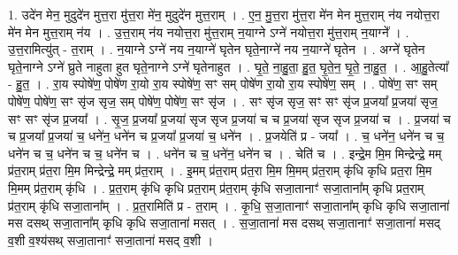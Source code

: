 \documentclass[17pt]{extarticle}
\begin{document}
1. उदे॑न मेन॒ मुदुदे॑न मुत्त॒रा मु॑त्त॒रा मे॑न॒ मुदुदे॑न मुत्त॒राम् । . ए॒न॒ मु॒त्त॒रा मु॑त्त॒रा मे॑न मेन मुत्त॒राम् न॑य नयोत्त॒रा मे॑न मेन मुत्त॒राम् न॑य । . उ॒त्त॒राम् न॑य नयोत्त॒रा मु॑त्त॒राम् न॒याग्ने ऽग्ने॑ नयोत्त॒रा मु॑त्त॒राम् न॒याग्ने᳚ । . उ॒त्त॒रामित्यु॑त् - त॒राम् । . न॒याग्ने ऽग्ने॑ नय न॒याग्ने॑ घृतेन घृते॒नाग्ने॑ नय न॒याग्ने॑ घृतेन । . अग्ने॑ घृतेन घृते॒नाग्ने ऽग्ने॑ घ्रुते नाहुता हुत घृते॒नाग्ने ऽग्ने॑ घृतेनाहुत । . घृ॒ते॒ ना॒हु॒ता॒ हु॒त॒ घृ॒ते॒न॒ घृ॒ते॒ ना॒हु॒त॒ । . आ॒हु॒तेत्या᳚ - हु॒त॒ । . रा॒य स्पोषे॑ण॒ पोषे॑ण रा॒यो रा॒य स्पोषे॑ण॒ सꣳ सम् पोषे॑ण रा॒यो रा॒य स्पोषे॑ण॒ सम् । . पोषे॑ण॒ सꣳ सम् पोषे॑ण॒ पोषे॑ण॒ सꣳ सृ॑ज सृज॒ सम् पोषे॑ण॒ पोषे॑ण॒ सꣳ सृ॑ज । . सꣳ सृ॑ज सृज॒ सꣳ सꣳ सृ॑ज प्र॒जया᳚ प्र॒जया॑ सृज॒ सꣳ सꣳ सृ॑ज प्र॒जया᳚ । . सृ॒ज॒ प्र॒जया᳚ प्र॒जया॑ सृज सृज प्र॒जया॑ च च प्र॒जया॑ सृज सृज प्र॒जया॑ च । . प्र॒जया॑ च च प्र॒जया᳚ प्र॒जया॑ च॒ धने॑न॒ धने॑न च प्र॒जया᳚ प्र॒जया॑ च॒ धने॑न । . प्र॒जयेति॑ प्र - जया᳚ । . च॒ धने॑न॒ धने॑न च च॒ धने॑न च च॒ धने॑न च च॒ धने॑न च । . धने॑न च च॒ धने॑न॒ धने॑न च । . चेति॑ च । . इन्द्रे॒म मि॒म मिन्द्रेन्द्रे॒ मम् प्र॑त॒राम् प्र॑त॒रा मि॒म मिन्द्रेन्द्रे॒ मम् प्र॑त॒राम् । . इ॒मम् प्र॑त॒राम् प्र॑त॒रा मि॒म मि॒मम् प्र॑त॒राम् कृ॑धि कृधि प्रत॒रा मि॒म मि॒मम् प्र॑त॒राम् कृ॑धि । . प्र॒त॒राम् कृ॑धि कृधि प्रत॒राम् प्र॑त॒राम् कृ॑धि सजा॒तानाꣳ॑ सजा॒ताना᳚म् कृधि प्रत॒राम् प्र॑त॒राम् कृ॑धि सजा॒ताना᳚म् । . प्र॒त॒रामिति॑ प्र - त॒राम् । . कृ॒धि॒ स॒जा॒तानाꣳ॑ सजा॒ताना᳚म् कृधि कृधि सजा॒ताना॑ मस दसथ् सजा॒ताना᳚म् कृधि कृधि सजा॒ताना॑ मसत् । . स॒जा॒ताना॑ मस दसथ् सजा॒तानाꣳ॑ सजा॒ताना॑ मसद् व॒शी व॒श्य॑सथ् सजा॒तानाꣳ॑ सजा॒ताना॑ मसद् व॒शी । \newline
\end{document}
